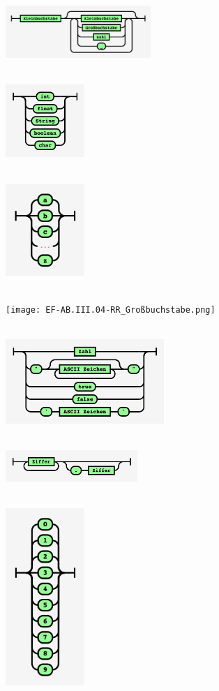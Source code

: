 \documentclass[10pt, a4paper, ngerman]{arbeitsblatt}
\begin{document}
\begin{multicols}{3}\centering
	\\
	\includegraphics[width=5.5cm]{EF-AB.III.04-RR_Bezeichner.png}

	\\
	\includegraphics[width=3cm]{EF-AB.III.04-RR_Datentyp.png}

	\\
	\includegraphics[width=3cm]{EF-AB.III.04-RR_Kleinbuchstabe.png}
	\columnbreak

	\\
	\texttt{[image: EF-AB.III.04-RR\_Großbuchstabe.png]}

	\\
	\includegraphics[width=6cm]{EF-AB.III.04-RR_Wert.png}

	\\
	\includegraphics[width=5cm]{EF-AB.III.04-RR_Zahl.png}
	\columnbreak

	\\
	\includegraphics[width=3cm]{EF-AB.III.04-RR_Ziffer.png}
\end{multicols}
\end{document}
